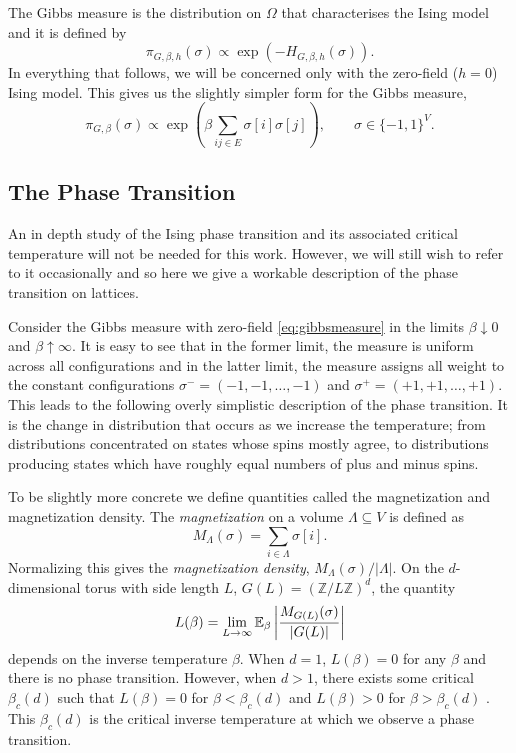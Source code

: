 	The Gibbs measure is the distribution on $\Omega$ that characterises the Ising model and it is defined by
	\begin{equation}
		\pi_{G, \beta, h}(\sigma) \propto \exp(-H_{G, \beta, h}(\sigma)).
		\label{eq:gibbsmeasurefull}
	\end{equation}
	In everything that follows, we will be concerned only with the zero-field ($h = 0$) Ising model. This gives us the slightly simpler form for the Gibbs measure,
	\begin{equation}
		\pi_{G, \beta}(\sigma) \propto \exp \left( \beta \sum_{ij \in E} \sigma[i] \sigma[j] \right), \qquad \sigma \in \{-1, 1\}^V.
		\label{eq:gibbsmeasure}
	\end{equation}

	\subsection{The Phase Transition}
	An in depth study of the Ising phase transition and its associated critical temperature will not be needed for this work. However, we will still wish to refer to it occasionally and so here we give a workable description of the phase transition on lattices.

	Consider the Gibbs measure with zero-field \eqref{eq:gibbsmeasure} in the limits $\beta \downarrow 0$ and $\beta \uparrow \infty$. It is easy to see that in the former limit, the measure is uniform across all configurations and in the latter limit, the measure assigns all weight to the constant configurations $\sigma^- = (-1, -1, \dots, -1)$ and $\sigma^+ = (+1, +1, \dots, +1)$. This leads to the following overly simplistic description of the phase transition. It is the change in distribution that occurs as we increase the temperature; from distributions concentrated on states whose spins mostly agree, to distributions producing states which have roughly equal numbers of plus and minus spins.

	To be slightly more concrete we define quantities called the magnetization and magnetization density. The \emph{magnetization} on a volume $\Lambda \subseteq V$ is defined as 
	\begin{equation}
		M_\Lambda(\sigma) = \sum_{i \in \Lambda} \sigma[i].
	\end{equation}
	Normalizing this gives the \emph{magnetization density}, $M_\Lambda(\sigma)/|\Lambda|$. On the $d$-dimensional torus with side length $L$, $G(L) = (\mathbb{Z}/L\mathbb{Z})^d$, the quantity
	\begin{equation}
		L(\beta) = \lim_{L \rightarrow \infty} \mathbb{E}_\beta \left|\frac{M_{G(L)}(\sigma)}{|G(L)|} \right|
		\label{eq:limitmagnetizationdensity}
	\end{equation}
	depends on the inverse temperature $\beta$. When $d = 1$, $L(\beta) = 0$ for any $\beta$ and there is no phase transition. However, when $d > 1$, there exists some critical $\beta_c(d)$ such that $L(\beta) = 0$ for $\beta < \beta_c(d)$ and $L(\beta) > 0$ for $\beta > \beta_c(d)$ \cite{Friedli2017-xm}. This $\beta_c(d)$ is the critical inverse temperature at which we observe a phase transition.


